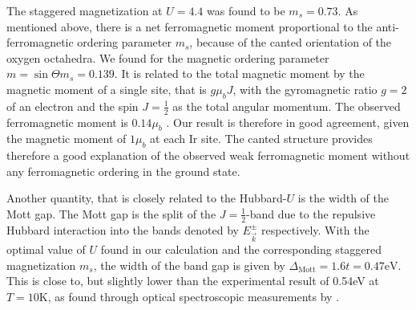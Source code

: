 The staggered magnetization at $U=4.4$ was found to be $m_s= 0.73$. 
As mentioned above, there is a net ferromagnetic moment proportional to the anti-ferromagnetic ordering 
parameter $m_s$, because of the canted orientation of the oxygen octahedra. 
We found for the magnetic ordering parameter $m =  \sin \Theta m_s= 0.139$. 
It is related to the total magnetic moment by the magnetic moment of a single site, that is $g\mu_b J$,
with the gyromagnetic ratio $g=2$ of an electron and the spin $J=\frac12$ as the total angular momentum. 
The observed ferromagnetic moment is $0.14\mu_b$ \cite{PhysRevB.57.R11039}. 
Our result is therefore in good agreement, given the magnetic moment of $1\mu_b$ at each Ir site. 
The canted structure provides therefore a good explanation of the observed weak ferromagnetic moment 
without any ferromagnetic ordering in the ground state.

Another quantity, that is closely related to the Hubbard-$U$ is the width of the Mott gap.
The Mott gap is the split of the $J=\frac12$-band due to the repulsive Hubbard interaction into the bands denoted by $E^{\pm}_{\vec k}$ respectively. 
With the optimal value of $U$ found in  our calculation and the corresponding staggered magnetization $m_s$, 
the width of the band gap is given by $\Delta_{\mathrm{Mott}}=1.6t=0.47\mathrm{eV}$.
This is close to, but slightly lower than the experimental result of 0.54eV  at $T=10$K,
as found through optical spectroscopic measurements by \citet{PhysRevB.80.195110}.


